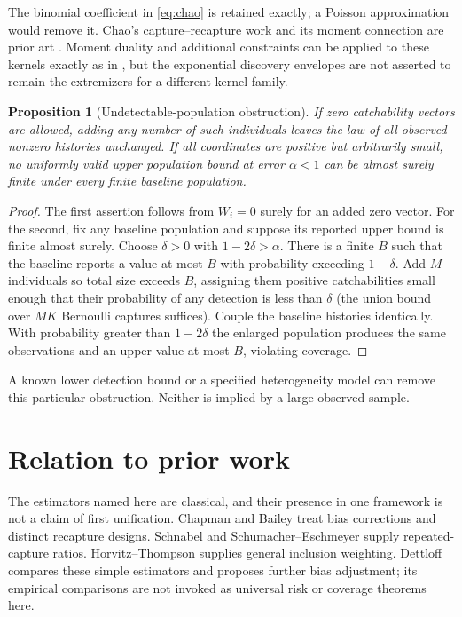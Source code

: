 \documentclass[11pt]{article}
\newtheorem{proposition}[theorem]{Proposition}
\theoremstyle{remark}\newtheorem{remark}[theorem]{Remark}
\begin{document}
The binomial coefficient in \eqref{eq:chao} is retained exactly; a Poisson
approximation would remove it. Chao's capture--recapture work and its moment
connection are prior art \cite{Chao1987}. Moment duality and additional
constraints can be applied to these kernels exactly as in
\cite{LongDiscovery}, but the exponential discovery envelopes are not
asserted to remain the extremizers for a different kernel family.

\begin{proposition}[Undetectable-population obstruction]\label{prop:obstruction}
If zero catchability vectors are allowed, adding any number of such
individuals leaves the law of all observed nonzero histories unchanged.
If all coordinates are positive but arbitrarily small, no uniformly valid
upper population bound at error $\alpha<1$ can be almost surely finite
under every finite baseline population.
\end{proposition}
\begin{proof}
The first assertion follows from $W_i=0$ surely for an added zero vector.
For the second, fix any baseline population and suppose its reported upper
bound is finite almost surely. Choose $\delta>0$ with $1-2\delta>\alpha$.
There is a finite $B$ such that the baseline reports a value at most $B$
with probability exceeding $1-\delta$. Add $M$ individuals so total size
exceeds $B$, assigning them positive catchabilities small enough that their
probability of any detection is less than $\delta$ (the union bound over
$MK$ Bernoulli captures suffices). Couple the baseline histories identically.
With probability greater than $1-2\delta$ the enlarged population produces
the same observations and an upper value at most $B$, violating coverage.
\end{proof}
A known lower detection bound or a specified heterogeneity model can remove
this particular obstruction. Neither is implied by a large observed sample.

\section{Relation to prior work}\label{sec:prior}
The estimators named here are classical, and their presence in one framework
is not a claim of first unification. Chapman \cite{Chapman1951} and Bailey
\cite{Bailey1951,Bailey1952} treat bias corrections and distinct recapture
designs. Schnabel \cite{Schnabel1938} and Schumacher--Eschmeyer
\cite{Schumacher1943} supply repeated-capture ratios. Horvitz--Thompson
\cite{HT1952} supplies general inclusion weighting. Dettloff
\cite{Dettloff2023} compares these simple estimators and proposes further
bias adjustment; its empirical comparisons are not invoked as universal
risk or coverage theorems here.
\end{document}

